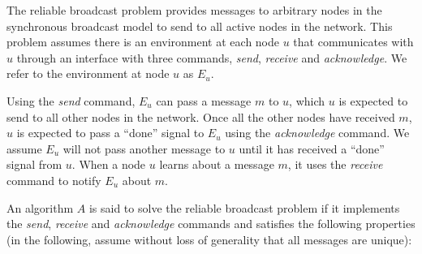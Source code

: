 \documentclass[english]{article}
\begin{document}
The reliable broadcast problem provides messages to arbitrary nodes in the synchronous broadcast model to send to all active nodes in the network. This problem assumes there is an environment at each node $u$ that communicates with $u$ through an  interface with three commands, \textit{send}, \textit{receive} and \textit{acknowledge}. We refer to the environment at node $u$ as $E_u$.

Using the \textit{send} command, $E_u$ can pass a message $m$ to $u$, which $u$ is expected to send to all other nodes in the network. Once all the other nodes have received $m$, $u$ is expected to pass a ``done'' signal to $E_u$ using the \textit{acknowledge} command. We assume $E_u$ will not pass another message to $u$ until it has received a ``done'' signal from $u$. 
When a node $u$ learns about a message $m$, it uses the \textit{receive} command to notify $E_u$ about $m$.

An algorithm $A$ is said to solve the reliable broadcast problem if it implements the \textit{send}, \textit{receive} and \textit{acknowledge} commands and satisfies the following properties (in the following, assume without loss of generality that all messages are unique):
\end{document}
